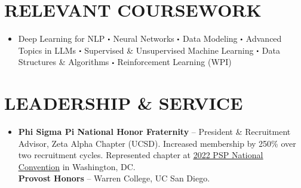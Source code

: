 \documentclass[letterpaper,11pt]{article}
\newcommand\sbullet[1][.5]{\mathbin{\vcenter{\hbox{\scalebox{#1}{$\bullet$}}}}}
\begin{document}
\section{RELEVANT COURSEWORK}
\vspace{-2pt}
    \begin{itemize}[leftmargin=0in, label={}]
    \item
    \small{Deep Learning for NLP $\sbullet$ Neural Networks $\sbullet$ Data Modeling $\sbullet$ Advanced Topics in LLMs $\sbullet$ Supervised \& Unsupervised Machine Learning $\sbullet$ Data Structures \& Algorithms $\sbullet$ Reinforcement Learning (WPI)} \\
    \end{itemize}
\vspace{-10pt}

\section{LEADERSHIP \& SERVICE}
\vspace{-2pt}
    \begin{itemize}[leftmargin=0in, label={}]
    \item
    \small{\textbf{Phi Sigma Pi National Honor Fraternity} -- President \& Recruitment Advisor, Zeta Alpha Chapter (UCSD). Increased membership by 250\% over two recruitment cycles. Represented chapter at \href{https://vimeo.com/873331411}{\underline{2022 PSP National Convention}} in Washington, DC.} \\[2pt]
    \small{\textbf{Provost Honors} -- Warren College, UC San Diego.} \\
    \end{itemize}
\end{document}
